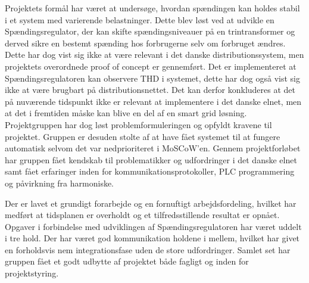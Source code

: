 

Projektets formål har været at undersøge, hvordan spændingen kan holdes stabil i et system med varierende belastninger. Dette blev løst ved at udvikle en Spændingsregulator, der kan skifte spændingsniveauer på en trintransformer og derved sikre en bestemt spænding hos forbrugerne selv om forbruget ændres. Dette har dog vist sig ikke at være relevant i det danske distributionssystem, men projektets overordnede proof of concept er gennemført. Det er implementeret at Spændingsregulatoren kan observere THD i systemet, dette har dog også vist sig ikke at være brugbart på distributionsnettet. Det kan derfor konkluderes at det på nuværende tidspunkt ikke er relevant at implementere i det danske elnet, men at det i fremtiden måske kan blive en del af en smart grid løsning. Projektgruppen har dog løst problemformuleringen og opfyldt kravene til projektet. Gruppen er desuden stolte af at have fået systemet til at fungere automatisk selvom det var nedprioriteret i MoSCoW'en. Gennem projektforløbet har gruppen fået kendskab til problematikker og udfordringer i det danske elnet samt fået erfaringer inden for kommunikationsprotokoller, PLC programmering og påvirkning fra harmoniske.  


Der er lavet et grundigt forarbejde og en fornuftigt arbejdsfordeling, hvilket har medført at tidsplanen er overholdt og et tilfredsstillende resultat er opnået. Opgaver i forbindelse med udviklingen af Spændingsregulatoren har været uddelt i tre hold. Der har været god kommunikation holdene i mellem, hvilket har givet en forholdsvis nem integrationsfase uden de store udfordringer. Samlet set har gruppen fået et godt udbytte af projektet både fagligt og inden for projektstyring.



 